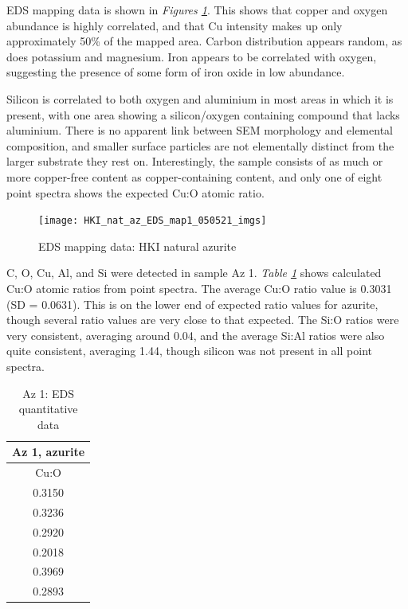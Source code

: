 EDS mapping data is shown in \textit{Figures \ref{fig:hki_map1}}. This shows that copper and oxygen abundance is highly correlated, and that Cu intensity makes up only approximately 50\% of the mapped area. Carbon distribution appears random, as does potassium and magnesium. Iron appears to be correlated with oxygen, suggesting the presence of some form of iron oxide in low abundance. 

Silicon is correlated to both oxygen and aluminium in most areas in which it is present, with one area showing a silicon/oxygen containing compound that lacks aluminium. There is no apparent link between SEM morphology and elemental composition, and smaller surface particles are not elementally distinct from the larger substrate they rest on. Interestingly, the sample consists of as much or more copper-free content as copper-containing content, and only one of eight point spectra shows the expected Cu:O atomic ratio. 

\begin{figure}[H]
\centering
  \texttt{[image: HKI\_nat\_az\_EDS\_map1\_050521\_imgs]}
\caption[EDS mapping data: HKI natural azurite]{EDS mapping data: HKI natural azurite}
\label{fig:hki_map1}
\end{figure}



C, O, Cu, Al, and Si were detected in sample Az 1. \textit{Table \ref{table:az1_ratios}} shows calculated Cu:O atomic ratios from point spectra. The average Cu:O ratio value is 0.3031 (SD = 0.0631). This is on the lower end of expected ratio values for azurite, though several ratio values are very close to that expected. The Si:O ratios were very consistent, averaging around 0.04, and the average Si:Al ratios were also quite consistent, averaging 1.44, though silicon was not present in all point spectra.

\begin{table}[H]
\caption{Az 1: EDS quantitative data}
\centering
\label{table:az1_ratios}
\begin{tabular}{c}
\toprule
Az 1, azurite \\
\midrule
Cu:O \\
\midrule
0.3150 \\
0.3236 \\
0.2920 \\
0.2018 \\
0.3969 \\
0.2893 \\
\bottomrule
\end{tabular}
\end{table}

